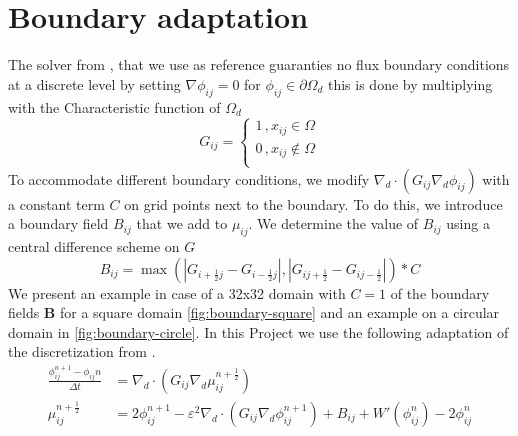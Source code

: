 \documentclass{mimosis}
\begin{document}
\chapter{Boundary adaptation}
\label{sec:org97bc677}
The solver from \autocite{SHIN20117441}, that we use as reference guaranties no flux boundary conditions at a discrete level by setting \(\nabla \phi_{ij} = 0\) for \(\phi_{ij} \in \partial \Omega_{d}\) this is done by multiplying with the Characteristic function of \(\Omega_{d}\)
\begin{equation}
G_{ij}=
\begin{cases}
1 \,, x_{ij} \in \Omega \\
0 \,, x_{ij} \not\in \Omega \\
\end{cases}
\end{equation}
To accommodate different boundary conditions, we modify \(\nabla_d \cdot (G_{ij} \nabla_d \phi_{ij})\) with a constant term \(C\) on grid points next to the boundary. To do this, we introduce a boundary field \(B_{ij}\) that we add to \(\mu_{ij}\). We determine the value of \(B_{ij}\) using a central difference scheme on \(G\)
\begin{equation}
B_{ij} = \max\left(  |G_{i+\frac{1}{2}j} - G_{i-\frac{1}{2}j}| , |G_{ij+\frac{1}{2}} - G_{ij-\frac{1}{2}}|\right) * C
\end{equation}
We present an example in case of a 32x32 domain with \(C=1\) of the boundary fields \(\mathbf{B}\) for a square domain \ref{fig:boundary-square} and an example on a circular domain in \ref{fig:boundary-circle}.
In this Project we use the following adaptation of the discretization from \autocite{SHIN20117441}.
\begin{equation}
\label{eq:second-order-adapted-ansatz}
\begin{aligned}
\frac{\phi_{ij}^{n+1} - \phi_{ij}n}{\Delta t}  &=  \nabla _d \cdot (G_{ij} \nabla_d \mu_{ij}^{n+\frac{1}{2}} )  \\
 \mu_{ij}^{n+\frac{1}{2}} &= 2\phi_{ij}^{n+1} - \varepsilon^2  \nabla_d \cdot  (G_{ij} \nabla _d \phi_{ij}^{n+1} ) + B_{ij} + W'(\phi_{ij}^n) - 2\phi _{ij}^n
\end{aligned}
\end{equation}
\end{document}

